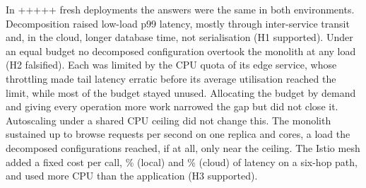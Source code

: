 In \the\numexpr{}+++++\relax{} fresh deployments the answers were the same in both environments. Decomposition raised
low-load p99 latency, mostly through inter-service transit and, in the cloud, longer database time, not serialisation (H1
supported). Under an equal
budget no decomposed configuration overtook the monolith at any load (H2 falsified). Each was limited by the CPU
quota of its edge service, whose throttling made tail latency erratic before its average utilisation reached the
limit, while most of the budget stayed unused. Allocating the budget by demand and giving every operation more work
narrowed the gap but did not close it.
Autoscaling under a shared CPU ceiling did not change this. The monolith sustained up to
 browse requests per second on one replica and  cores, a load
the decomposed configurations reached, if at all, only near the ceiling.
The Istio mesh added a fixed cost per call, \% (local) and \% (cloud) of
latency on a six-hop path, and used more CPU than the application (H3 supported).

